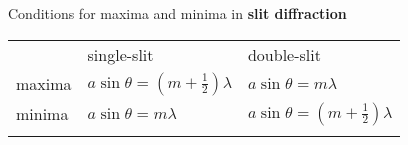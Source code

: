 \documentclass[11pt]{paper}
\begin{document}
\egroup
Conditions for maxima and minima in \textbf{slit diffraction}
\begin{table}[h]
\centering
\bgroup
\def\arraystretch{1.5}
\begin{tabular}{lll}
                                  & single-slit  & double-slit    \\ \cline{2-3} 
\multicolumn{1}{l|}{maxima} & \multicolumn{1}{l|}{$a\sin{\theta} = (m+\frac{1}{2})\lambda$} & \multicolumn{1}{l|}{$a\sin{\theta} = m\lambda$} \\ \cline{2-3} 
\multicolumn{1}{l|}{minima}  & \multicolumn{1}{l|}{$a\sin{\theta} = m\lambda$} & \multicolumn{1}{l|}{$a\sin{\theta} = \left(m+\frac{1}{2}\right)\lambda$} \\ \cline{2-3}\\ 
\end{tabular}
\egroup
\end{table}
\newpage

\end{document}
